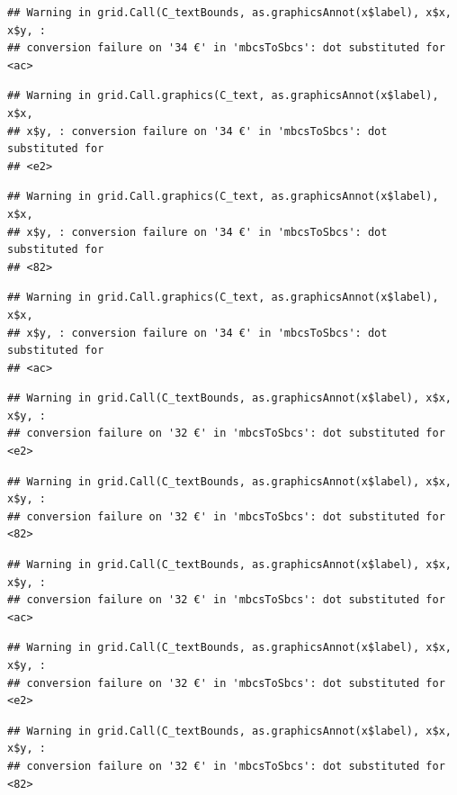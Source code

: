 \documentclass[]{gitbook}
\begin{document}
\begin{verbatim}
## Warning in grid.Call(C_textBounds, as.graphicsAnnot(x$label), x$x, x$y, :
## conversion failure on '34 €' in 'mbcsToSbcs': dot substituted for <ac>
\end{verbatim}

\begin{verbatim}
## Warning in grid.Call.graphics(C_text, as.graphicsAnnot(x$label), x$x,
## x$y, : conversion failure on '34 €' in 'mbcsToSbcs': dot substituted for
## <e2>
\end{verbatim}

\begin{verbatim}
## Warning in grid.Call.graphics(C_text, as.graphicsAnnot(x$label), x$x,
## x$y, : conversion failure on '34 €' in 'mbcsToSbcs': dot substituted for
## <82>
\end{verbatim}

\begin{verbatim}
## Warning in grid.Call.graphics(C_text, as.graphicsAnnot(x$label), x$x,
## x$y, : conversion failure on '34 €' in 'mbcsToSbcs': dot substituted for
## <ac>
\end{verbatim}

\begin{verbatim}
## Warning in grid.Call(C_textBounds, as.graphicsAnnot(x$label), x$x, x$y, :
## conversion failure on '32 €' in 'mbcsToSbcs': dot substituted for <e2>
\end{verbatim}

\begin{verbatim}
## Warning in grid.Call(C_textBounds, as.graphicsAnnot(x$label), x$x, x$y, :
## conversion failure on '32 €' in 'mbcsToSbcs': dot substituted for <82>
\end{verbatim}

\begin{verbatim}
## Warning in grid.Call(C_textBounds, as.graphicsAnnot(x$label), x$x, x$y, :
## conversion failure on '32 €' in 'mbcsToSbcs': dot substituted for <ac>
\end{verbatim}

\begin{verbatim}
## Warning in grid.Call(C_textBounds, as.graphicsAnnot(x$label), x$x, x$y, :
## conversion failure on '32 €' in 'mbcsToSbcs': dot substituted for <e2>
\end{verbatim}

\begin{verbatim}
## Warning in grid.Call(C_textBounds, as.graphicsAnnot(x$label), x$x, x$y, :
## conversion failure on '32 €' in 'mbcsToSbcs': dot substituted for <82>
\end{verbatim}
\end{document}
